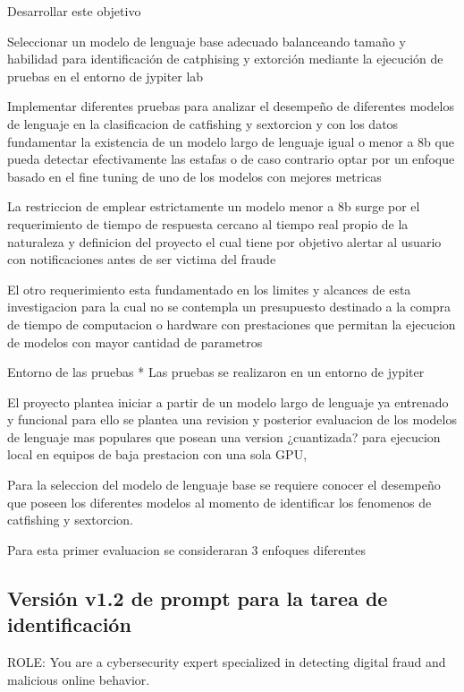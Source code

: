 \documentclass{article}
\begin{document}
Desarrollar este objetivo

Seleccionar un modelo de lenguaje base adecuado balanceando tama{\~{n}}o y habilidad para identificaci{\'{o}}n de catphising y extorci{\'{o}}n mediante la ejecuci{\'{o}}n de pruebas en el entorno de jypiter lab 

Implementar diferentes pruebas para analizar el desempeño de diferentes modelos de lenguaje en la clasificacion de catfishing y sextorcion y con los datos fundamentar la existencia de un modelo largo de lenguaje igual o menor a 8b que pueda detectar efectivamente las estafas o de caso contrario optar por un enfoque basado en el fine tuning de uno de los modelos con mejores metricas   

La restriccion de emplear estrictamente un modelo menor a 8b surge por el requerimiento de tiempo de respuesta cercano al tiempo real propio de la naturaleza y definicion del proyecto el cual tiene por objetivo alertar al usuario con notificaciones antes de ser victima del fraude

El otro requerimiento esta fundamentado en los limites y alcances de esta investigacion para la cual no se contempla un presupuesto destinado a la compra de tiempo de computacion o hardware con prestaciones que permitan la ejecucion de modelos con mayor cantidad de parametros 

Entorno de las pruebas
* Las pruebas se realizaron en un entorno de jypiter  


El proyecto plantea iniciar a partir de un modelo largo de lenguaje ya entrenado y funcional para ello se plantea una revision y posterior evaluacion de los modelos de lenguaje mas populares que posean una version ¿cuantizada? para ejecucion local en equipos de baja prestacion con una sola GPU, 

Para la seleccion del modelo de lenguaje base se requiere conocer el desempeño que poseen los diferentes modelos al momento de identificar los fenomenos de catfishing y sextorcion.

Para esta primer evaluacion se consideraran 3 enfoques diferentes 

\subsection{Versión v1.2 de prompt para la tarea de identificación}

ROLE: You are a cybersecurity expert specialized in detecting digital fraud and malicious online behavior.
        
\end{document}
